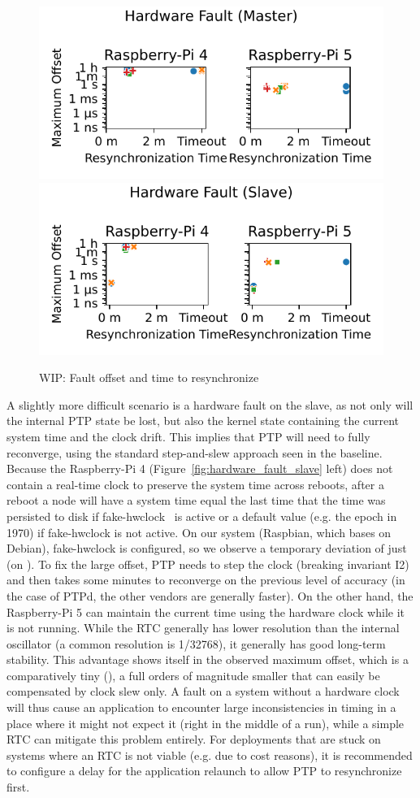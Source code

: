 \begin{figure}
    \includegraphics[width=0.49\linewidth]{res/generated/fault/hardware/master/fault_scatter.pdf}
    \includegraphics[width=0.49\linewidth]{res/generated/fault/hardware/slave/fault_scatter.pdf}
    \caption{WIP: Fault offset and time to resynchronize}
    \label{fig:fault_offsets}
\end{figure}

A slightly more difficult scenario is a hardware fault on the slave, as not only will the internal PTP state be lost, but also the kernel state containing the current system time and the clock drift. This implies that PTP will need to fully reconverge, using the standard step-and-slew approach seen in the baseline. Because the Raspberry-Pi 4 (Figure~\ref{fig:hardware_fault_slave} left) does not contain a real-time clock to preserve the system time across reboots, after a reboot a node will have a system time equal the last time that the time was persisted to disk if fake-hwclock~\cite{fake-hwclock-manpage} is active or a default value (e.g. the epoch in 1970) if fake-hwclock is not active. On our system (Raspbian, which bases on Debian), fake-hwclock is configured, so we observe a temporary deviation of just \fTimeMin{\cmpMax} (on \fVendor{\cmpMaxArg}). To fix the large offset, PTP needs to step the clock (breaking invariant I2) and then takes some minutes to reconverge on the previous level of accuracy (in the case of PTPd, the other vendors are generally faster). On the other hand, the Raspberry-Pi 5 can maintain the current time using the hardware clock while it is not running. While the RTC generally has lower resolution than the internal oscillator (a common resolution is 1/32768), it generally has good long-term stability. This advantage shows itself in the observed maximum offset, which is a comparatively tiny \fTime{\cmpMax} (\fVendor{\cmpMaxArg}), a full  orders of magnitude smaller that can easily be compensated by clock slew only. A fault on a system without a hardware clock will thus cause an application to encounter large inconsistencies in timing in a place where it might not expect it (right in the middle of a run), while a simple RTC can mitigate this problem entirely. For deployments that are stuck on systems where an RTC is not viable (e.g. due to cost reasons), it is recommended to configure a delay for the application relaunch to allow PTP to resynchronize first.


